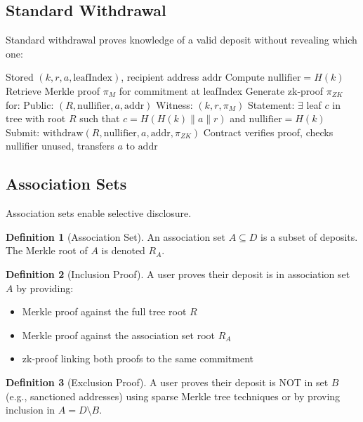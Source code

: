 \documentclass[11pt,a4paper]{article}
\theoremstyle{definition}
\newtheorem{definition}{Definition}
\begin{document}
\subsection{Standard Withdrawal}

Standard withdrawal proves knowledge of a valid deposit without revealing which one:

\begin{algorithm}
\caption{Standard Withdrawal}
\begin{algorithmic}[1]
\Require Stored $(k, r, a, \text{leafIndex})$, recipient address $\text{addr}$
\State Compute $\text{nullifier} = H(k)$
\State Retrieve Merkle proof $\pi_M$ for commitment at leafIndex
\State Generate zk-proof $\pi_{ZK}$ for:
\Statex \quad Public: $(R, \text{nullifier}, a, \text{addr})$
\Statex \quad Witness: $(k, r, \pi_M)$
\Statex \quad Statement: $\exists$ leaf $c$ in tree with root $R$ such that
\Statex \quad\quad $c = H(H(k) \| a \| r)$ and $\text{nullifier} = H(k)$
\State Submit: $\text{withdraw}(R, \text{nullifier}, a, \text{addr}, \pi_{ZK})$
\State Contract verifies proof, checks nullifier unused, transfers $a$ to $\text{addr}$
\end{algorithmic}
\end{algorithm}

\subsection{Association Sets}

Association sets enable selective disclosure.

\begin{definition}[Association Set]
An association set $A \subseteq D$ is a subset of deposits. The Merkle root of $A$ is denoted $R_A$.
\end{definition}

\begin{definition}[Inclusion Proof]
A user proves their deposit is in association set $A$ by providing:
\begin{itemize}
    \item Merkle proof against the full tree root $R$
    \item Merkle proof against the association set root $R_A$
    \item zk-proof linking both proofs to the same commitment
\end{itemize}
\end{definition}

\begin{definition}[Exclusion Proof]
A user proves their deposit is NOT in set $B$ (e.g., sanctioned addresses) using sparse Merkle tree techniques or by proving inclusion in $A = D \setminus B$.
\end{definition}
\end{document}
